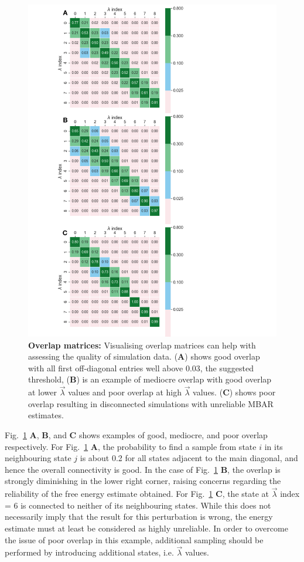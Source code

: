 \documentclass[9pt,bestpractices]{livecoms}
\begin{document}
\begin{figure}
\includegraphics[width=0.90\columnwidth]{figures/fig12_overlap/Figure.pdf}
\caption{\label{fig:overlap} \textbf{Overlap matrices:} Visualising overlap matrices can help with assessing the quality of simulation data. (\textbf{A}) shows good overlap with all first off-diagonal entries well above 0.03, the suggested threshold, (\textbf{B}) is an example of mediocre overlap with good overlap at lower $\vec{\lambda}$ values and poor overlap at high $\vec{\lambda}$ values. (\textbf{C}) shows poor overlap resulting in disconnected simulations with unreliable MBAR estimates.}
\end{figure}

Fig.~\ref{fig:overlap} \textbf{A}, \textbf{B}, and \textbf{C} shows examples of good, mediocre, and poor overlap respectively. For Fig.~\ref{fig:overlap} \textbf{A}, the probability to find a sample from state $i$ in its neighbouring state $j$ is about 0.2 for all states adjacent to the main diagonal, and hence the overall connectivity is good. In the case of Fig.~\ref{fig:overlap} \textbf{B}, the overlap is strongly diminishing in the lower right corner, raising concerns regarding the reliability of the free energy estimate obtained. For Fig.~\ref{fig:overlap} \textbf{C}, the state at $\vec{\lambda}$ index = 6 is connected to neither of its neighbouring states. While this does not necessarily imply that the result for this perturbation is wrong, the energy estimate must at least be considered as highly unreliable.
In order to overcome the issue of poor overlap in this example, additional sampling should be performed by introducing additional states, i.e. $\vec{\lambda}$ values.
\end{document}
